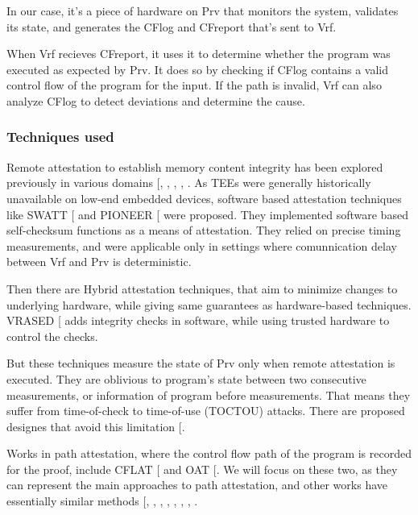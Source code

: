 \documentclass[a4paper, nobind]{templates/ociamthesis}
\begin{document}
In our case, it's a piece of hardware on Prv that monitors the system, validates its state,
and generates the CFlog and CFreport that's sent to Vrf.

When Vrf recieves CFreport, it uses it to determine whether the program was executed as expected by Prv.
It does so by checking if CFlog contains a valid control flow of the program
for the input. If the path is invalid, Vrf can also analyze CFlog to detect
deviations and determine the cause.

\subsubsection{Techniques used}\label{cfatechniques}

Remote attestation to establish memory content integrity has been explored previously
in various domains {[}, , , , \citeproc{ref-sun2020oat}{52}{]}.
As TEEs were generally historically unavailable on low-end embedded devices,
software based attestation techniques like SWATT {[}\citeproc{ref-seshadri2004swatt}{49}{]} and
PIONEER {[}\citeproc{ref-seshadri2005pioneer}{48}{]} were proposed.
They implemented software based self-checksum functions as a means of attestation.
They relied on precise timing measurements, and were applicable only in settings where
comunnication delay between Vrf and Prv is deterministic.

Then there are Hybrid attestation techniques, that aim to minimize changes to
underlying hardware, while giving same guarantees as hardware-based techniques.
VRASED {[}\citeproc{ref-nunes2019vrased}{42}{]} adds integrity checks in software, while using trusted hardware to control the checks.

But these techniques measure the state of Prv only when remote attestation is executed.
They are oblivious to program's state between two consecutive measurements, or
information of program before measurements. That means they suffer from
time-of-check to time-of-use (TOCTOU) attacks. There are proposed designes that
avoid this limitation {[}\citeproc{ref-de2021toctou}{24}{]}.

Works in path attestation, where the control flow path of the program is recorded
for the proof, include CFLAT {[}\citeproc{ref-abera2016cflat}{2}{]} and OAT {[}\citeproc{ref-sun2020oat}{52}{]}.
We will focus on these two, as they can represent the main approaches to path
attestation, and other works have essentially similar methods {[}, , , , , , , \citeproc{ref-zhang2021recfa}{57}{]}.
\end{document}
